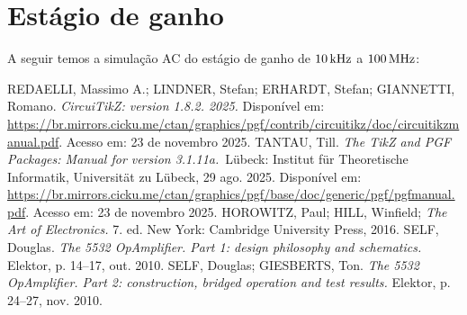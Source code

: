 \documentclass[12pt, a4paper, leqno, twoside]{book}
\begin{document}
  \section{Est\'agio de ganho}
  A seguir temos a simula\c c\~ao AC do est\'agio de ganho de $10\,\rm kHz$ a $100\,\rm MHz$:

  


  

  \begin{thebibliography}{}
    REDAELLI, Massimo A.; LINDNER, Stefan; ERHARDT, Stefan; GIANNETTI, Romano. {\it CircuiTikZ: version 1.8.2. 2025.} Dispon\'ivel em: \url{https://br.mirrors.cicku.me/ctan/graphics/pgf/contrib/circuitikz/doc/circuitikzmanual.pdf}. Acesso em: 23 de novembro 2025.
    TANTAU, Till. {\it The TikZ and PGF Packages: Manual for version 3.1.11a.}~Lübeck: Ins\-titut für Theoretische Informatik, Universität zu Lübeck, 29 ago. 2025. Disponível em: \url{https://br.mirrors.cicku.me/ctan/graphics/pgf/base/doc/generic/pgf/pgfmanual.pdf}. Acesso em: 23 de novembro 2025.
    HOROWITZ, Paul; HILL, Winfield; {\it The Art of Electronics.} 7. ed. New York: Cambridge University Press, 2016.
    SELF, Douglas. {\it The 5532 OpAmplifier. Part 1: design philosophy and schematics.} Elektor, p. 14--17, out. 2010.
    SELF, Douglas; GIESBERTS, Ton. {\it The 5532 OpAmplifier. Part 2: construction, bridged operation and test results.} Elektor, p. 24--27, nov. 2010.
  \end{thebibliography}
\fi
\end{document}
